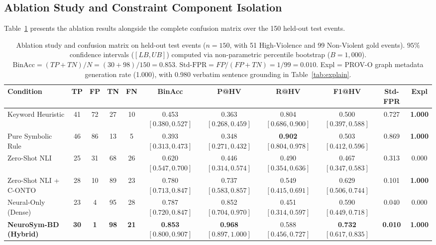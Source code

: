 \documentclass[11pt,a4paper]{article}
\begin{document}
\subsection{Ablation Study and Constraint Component Isolation}

Table~\ref{tab:ablation} presents the ablation results alongside the complete confusion matrix over the 150 held-out test events.

\begin{table}[h]
\centering
\small
\caption{Ablation study and confusion matrix on held-out test events ($n=150$, with 51 High-Violence and 99 Non-Violent gold events). $95\%$ confidence intervals ($[LB, UB]$) computed via non-parametric percentile bootstrap ($B=1,000$). $\text{BinAcc} = (TP+TN)/N = (30+98)/150 = 0.853$. $\text{Std-FPR} = FP/(FP+TN) = 1/99 = 0.010$. Expl = PROV-O graph metadata generation rate (1.000), with 0.980 verbatim sentence grounding in Table~\ref{tab:explain}.}
\label{tab:ablation}
\begin{tabular}{lcccccccccc}
\toprule
\textbf{Condition} & \textbf{TP} & \textbf{FP} & \textbf{TN} & \textbf{FN} & \textbf{BinAcc} & \textbf{P@HV} & \textbf{R@HV} & \textbf{F1@HV} & \textbf{Std-FPR} & \textbf{Expl} \\
\midrule
Keyword Heuristic       & 41 & 72 & 27 & 10 & 0.453 \scriptsize{$[0.380, 0.527]$} & 0.363 \scriptsize{$[0.268, 0.459]$} & 0.804 \scriptsize{$[0.686, 0.900]$} & 0.500 \scriptsize{$[0.397, 0.588]$} & 0.727 & \textbf{1.000} \\
Pure Symbolic Rule      & 46 & 86 & 13 & 5  & 0.393 \scriptsize{$[0.313, 0.473]$} & 0.348 \scriptsize{$[0.271, 0.432]$} & \textbf{0.902} \scriptsize{$[0.804, 0.978]$} & 0.503 \scriptsize{$[0.412, 0.596]$} & 0.869 & \textbf{1.000} \\
Zero-Shot NLI           & 25 & 31 & 68 & 26 & 0.620 \scriptsize{$[0.547, 0.700]$} & 0.446 \scriptsize{$[0.314, 0.574]$} & 0.490 \scriptsize{$[0.354, 0.636]$} & 0.467 \scriptsize{$[0.347, 0.583]$} & 0.313 & 0.000 \\
Zero-Shot NLI + C-ONTO  & 28 & 10 & 89 & 23 & 0.780 \scriptsize{$[0.713, 0.847]$} & 0.737 \scriptsize{$[0.583, 0.857]$} & 0.549 \scriptsize{$[0.415, 0.691]$} & 0.629 \scriptsize{$[0.506, 0.744]$} & 0.101 & \textbf{1.000} \\
Neural-Only (Dense)     & 23 & 4  & 95 & 28 & 0.787 \scriptsize{$[0.720, 0.847]$} & 0.852 \scriptsize{$[0.704, 0.970]$} & 0.451 \scriptsize{$[0.314, 0.597]$} & 0.590 \scriptsize{$[0.449, 0.718]$} & 0.040 & 0.000 \\
\textbf{NeuroSym-BD (Hybrid)} & \textbf{30} & \textbf{1}  & \textbf{98} & \textbf{21} & \textbf{0.853} \scriptsize{$[0.800, 0.907]$} & \textbf{0.968} \scriptsize{$[0.897, 1.000]$} & 0.588 \scriptsize{$[0.456, 0.727]$} & \textbf{0.732} \scriptsize{$[0.617, 0.835]$} & \textbf{0.010} & \textbf{1.000} \\
\bottomrule
\end{tabular}
\end{table}
\end{document}
